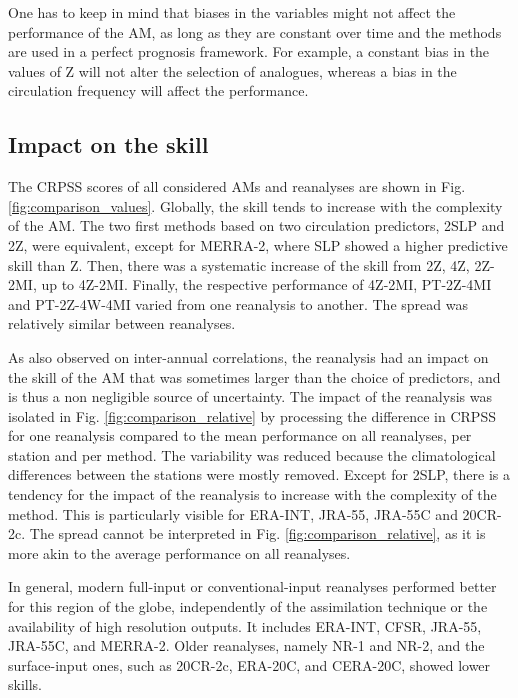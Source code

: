\documentclass{ametsoc}
\begin{document}
One has to keep in mind that biases in the variables might not affect the performance of the AM, as long as they are constant over time and the methods are used in a perfect prognosis framework. For example, a constant bias in the values of Z will not alter the selection of analogues, whereas a bias in the circulation frequency will affect the performance.


\subsection{Impact on the skill}

The CRPSS scores of all considered AMs and reanalyses are shown in Fig. \ref{fig:comparison_values}. Globally, the skill tends to increase with the complexity of the AM. The two first methods based on two circulation predictors, 2SLP and 2Z, were equivalent, except for MERRA-2, where SLP showed a higher predictive skill than Z. Then, there was a systematic increase of the skill from 2Z, 4Z, 2Z-2MI, up to 4Z-2MI. Finally, the respective performance of 4Z-2MI, PT-2Z-4MI and PT-2Z-4W-4MI varied from one reanalysis to another. The spread was relatively similar between reanalyses.

As \citet{Dayon2015} also observed on inter-annual correlations, the reanalysis had an impact on the skill of the AM that was sometimes larger than the choice of predictors, and is thus a non negligible source of uncertainty. The impact of the reanalysis was isolated in Fig. \ref{fig:comparison_relative} by processing the difference in CRPSS for one reanalysis compared to the mean performance on all reanalyses, per station and per method. The variability was reduced because the climatological differences between the stations were mostly removed. Except for 2SLP, there is a tendency for the impact of the reanalysis to increase with the complexity of the method. This is particularly visible for ERA-INT, JRA-55, JRA-55C and 20CR-2c. The spread cannot be interpreted in Fig. \ref{fig:comparison_relative}, as it is more akin to the average performance on all reanalyses.

In general, modern full-input or conventional-input reanalyses performed better for this region of the globe, independently of the assimilation technique or the availability of high resolution outputs. It includes ERA-INT, CFSR, JRA-55, JRA-55C, and MERRA-2. Older reanalyses, namely NR-1 and NR-2, and the surface-input ones, such as 20CR-2c, ERA-20C, and CERA-20C, showed lower skills.
\end{document}
